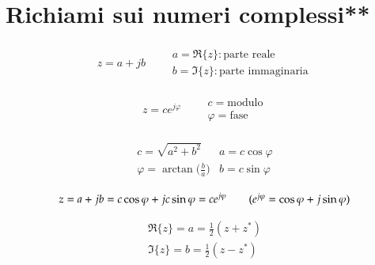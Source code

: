 
\chapter{Richiami sui numeri complessi**}
\label{cha:numeri-complessi}


\begin{align*}
z=a+jb\qquad \begin{array}{l}
a=\Re{\{z\}}:\text{parte reale}\\
b=\Im{\{z\}}:\text{parte immaginaria}
\end{array}\end{align*}

\begin{align*}
z=ce^{j\varphi}\qquad\begin{array}{l}
c=\text{modulo}\\
\varphi=\text{fase}
\end{array}\end{align*}

\begin{center}\end{center}

\begin{align*}\begin{array}{ll}
c=\sqrt{a^2+b^2} & a=c\cos\varphi\\
\varphi=\arctan\biggl(\frac{b}{a}\biggr) & b=c\sin\varphi
\end{array}\end{align*}

\begin{align*}
z=a+jb=c\cos\varphi +jc\sin\varphi=ce^{j\varphi}  \tag{$e^{j\varphi}=\cos\varphi+j\sin\varphi$}
\end{align*}

\begin{align*}
\Re{\{z\}}=a=\frac{1}{2}(z+z^*)\\
\Im{\{z\}}=b=\frac{1}{2}(z-z^*)
\end{align*}

